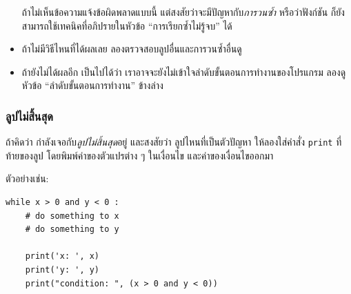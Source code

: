 \begin{itemize}
ถ้าไม่เห็นข้อความแจ้งข้อผิดพลาดแบบนี้ แต่สงสัยว่าจะมีปัญหากับ\textit{การวนซ้ำ} หรือว่าฟังก์ชัน
ก็ยังสามารถใช้เทคนิคที่อภิปรายในหัวข้อ ``การเรียกซ้ำไม่รู้จบ'' ได้


\item ถ้าไม่มีวิธีไหนที่ได้ผลเลย 
ลองตรวจสอบลูปอื่นและการวนซ้ำอื่นดู


\item ถ้ายังไม่ได้ผลอีก
เป็นไปได้ว่า เราอาจจะยังไม่เข้าใจลำดับขั้นตอนการทำงานของโปรแกรม
ลองดูหัวข้อ ``ลำดับขั้นตอนการทำงาน'' ข้างล่าง

\end{itemize}


\subsubsection{ลูปไม่สิ้นสุด}


ถ้าคิดว่า กำลังเจอกับ\textit{ลูปไม่สิ้นสุด}อยู่
และสงสัยว่า ลูปไหนที่เป็นตัวปัญหา
ให้ลองใส่คำสั่ง \texttt{print} ที่ท้ายของลูป โดยพิมพ์ค่าของตัวแปรต่าง ๆ ในเงื่อนไข และค่าของเงื่อนไขออกมา

ตัวอย่างเช่น:

\begin{verbatim}
while x > 0 and y < 0 :
    # do something to x
    # do something to y

    print('x: ', x)
    print('y: ', y)
    print("condition: ", (x > 0 and y < 0))
\end{verbatim}
%

